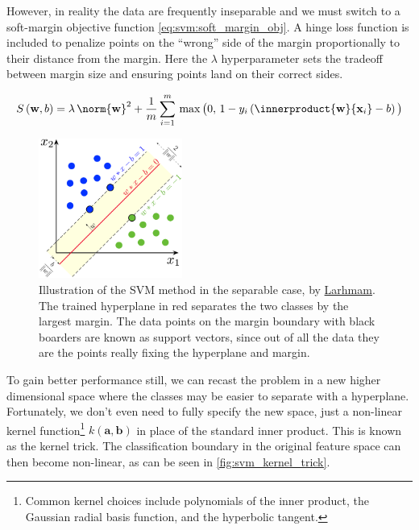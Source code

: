 However, in reality the data are frequently inseparable and we must switch
to a soft-margin objective function \cref{eq:svm:soft_margin_obj}.
A hinge loss function is included to penalize points on the ``wrong'' side of the margin
proportionally to their distance from the margin.
Here the $\lambda$ hyperparameter sets the tradeoff between
margin size and ensuring points land on their correct sides.

\begin{equation} \label{eq:svm:soft_margin_obj}
S\left(\mathbf{w}, b\right) =
\lambda\, \norm{\mathbf{w}}^{2}
+ \frac{1}{m} \sum_{i=1}^{m} \,
\max{\big(0,\, 1 - y_{i} \left(\innerproduct{\mathbf{w}}{\mathbf{x}_{i}} - b\right)\big)}
\end{equation}

\begin{figure}[H]
\centering
\includegraphics[width=0.42\textwidth]{figures/ml/svm_margin.png}
\vspace{0.2cm}
\caption{
Illustration of the SVM method in the separable case,
by \href{https://en.wikipedia.org/wiki/File:SVM_margin.png}{Larhmam}.
The trained hyperplane in red separates the two classes by the largest margin.
The data points on the margin boundary with black boarders
are known as support vectors, since out of all the data
they are the points really fixing the hyperplane and margin.
}
\label{fig:svm_sep}
\end{figure}

To gain better performance still, we can recast the problem in
a new higher dimensional space where the classes may be easier to separate with a hyperplane.
Fortunately, we don't even need to fully specify the new space,
just a non-linear kernel function\footnote{Common kernel choices include
polynomials of the inner product,
the Gaussian radial basis function,
and the hyperbolic tangent.} $k\left(\mathbf{a},\mathbf{b}\right)$
in place of the standard inner product. This is known as the kernel trick.
The classification boundary in the original feature space can then become non-linear,
as can be seen in \cref{fig:svm_kernel_trick}.


